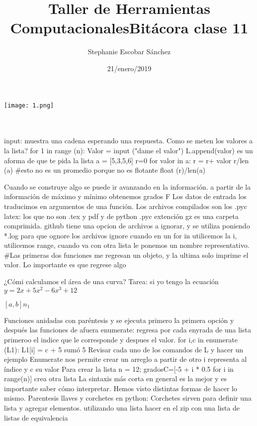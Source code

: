 \documentclass{article}
\title{\Huge Taller de Herramientas Computacionales}
\author{Stephanie Escobar Sánchez}
\date{21/enero/2019}
\begin{document}
	\maketitle
\begin{center}
	\texttt{[image: 1.png]}	
\end{center}
\newpage
\title{\Huge Bitácora clase 11} \\
\\
input: muestra una cadena esperando una respuesta.
Como se meten los valores a la lista?
for 1 in range (n):
	Valor = input ("dame el valor")
	L.append(valor)
es un aforma de que te pida la lista 
a = [5,3,5,6]
r=0
for valor in a:
r = r+ valor
r/len (a) \#esto no es un promedio porque no es flotante
float (r)/len(a) 
	

Cuando se construye algo se puede ir avanzando en la información. 
a partir de la información de máximo y mínimo obtenemos grados F
Los datos de entrada los traducimos en argumentos de una función.
Los archivos compilados son los .pyc
latex: los que no son .tex y pdf y de python .pyc
extención gz es una carpeta comprimida. github tiene una opcion de archivos a ignorar, y se utiliza poniendo *.log para que ognore los archivos ignore 
cuando en un for in utilicemos la i, utilicemos range, cuando va con otra lista le ponemos un nombre representativo.
\#Las primeras dos funciones me regresan un objeto, y la ultima solo imprime el valor. Lo importante es que regrese algo

¿Cómi calculamos el área de una curva?
Tarea: si yo tengo la ecuación $y= 2x+5x^{2}-6x^{3}+12$

$[a,b] n_{1} $

Funciones anidadas con paréntesis y se ejecuta primero la primera opción  y después las funciones de afuera
enumerate: regresa por cada enyrada de una lista primeroo el indice que le corresponde y despues el valor.
for i,c in enumerate (L1):
L1[i] = c + 5
sumó 5 
Revisar cada uno de los comandos de L y hacer un ejemplo
Enumerate nos permite crear un arreglo a partir de otro i representa al índice y c su valor
Para crear la lista n = 12; gradosC=[-5 + i * 0.5 for i in range(n)] crea otra lista 
La sintaxis más corta en general es la mejor y es importante saber cómo interpretar. Hemos visto distintas formas de hacer lo mismo.
Parentesis llaves y corchetes en python: Corchetes sirven para definir una lista y agregar elementos.
utilizando una lista hacer en el zip con una lista de listas de equivalencia
\end{document}

